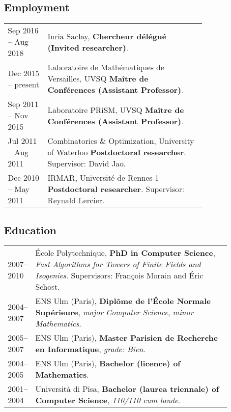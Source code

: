 \documentclass{book}
\begin{document}
\subsection*{Employment}

\begin{tabular}{l p{0.8\linewidth}}
  Sep 2016 -- Aug 2018 & Inria Saclay, \textbf{Chercheur délégué
                         (Invited researcher)}.\\
  Dec 2015 -- present & Laboratoire de
                        Mathématiques de Versailles, UVSQ \textbf{Maître de
                        Conférences (Assistant Professor)}.\\
  Sep 2011 -- Nov 2015 &
                         Laboratoire PRiSM, UVSQ \textbf{Maître de
                         Conférences (Assistant Professor)}.\\
  Jul 2011 -- Aug 2011 &
                         Combinatorics \& Optimization, University of Waterloo
                         \textbf{Postdoctoral researcher}. Supervisor: David Jao.\\
  Dec 2010 -- May 2011 & IRMAR,
                         Université de Rennes 1 \textbf{Postdoctoral researcher}.
                         Supervisor: Reynald Lercier.
\end{tabular}

\subsection*{Education}

\begin{tabular}{l p{0.9\linewidth}}
  2007--2010 & École Polytechnique, \textbf{PhD in Computer
               Science}, \emph{Fast Algorithms for Towers of Finite Fields and
               Isogenies}. Supervisors: François Morain and Éric Schost.\\
  2004--2007 & ENS Ulm (Paris), \textbf{Diplôme de
               l'École Normale Supérieure}, \emph{major Computer Science}, \emph{minor
               Mathematics}.\\
  2005--2007 & ENS Ulm (Paris), \textbf{Master
               Parisien de Recherche en Informatique}, \emph{grade: Bien}. \\
  2004--2005
             & ENS Ulm (Paris), \textbf{Bachelor (licence) of Mathematics}.\\
  2001--2004 & Università di Pisa, \textbf{Bachelor (laurea
               triennale) of Computer Science}, \emph{110/110 cum laude}.
\end{tabular}
\end{document}
